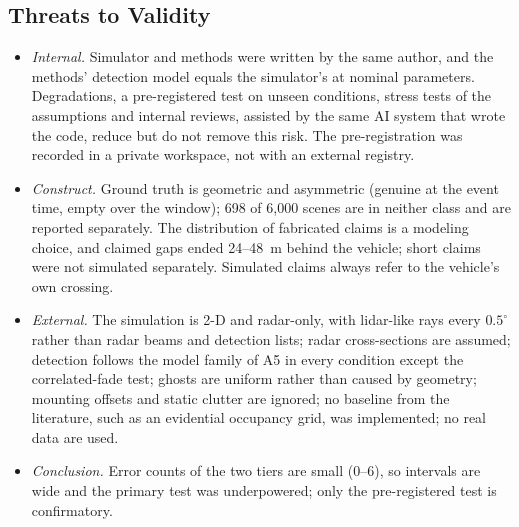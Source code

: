 \subsection{Threats to Validity}
\begin{itemize}
\item \emph{Internal.} Simulator and methods were written by the same author, and the methods' detection model equals the simulator's at nominal parameters. Degradations, a pre-registered test on unseen conditions, stress tests of the assumptions and internal reviews, assisted by the same AI system that wrote the code, reduce but do not remove this risk. The pre-registration was recorded in a private workspace, not with an external registry.
\item \emph{Construct.} Ground truth is geometric and asymmetric (genuine at the event time, empty over the window); 698 of 6,000 scenes are in neither class and are reported separately. The distribution of fabricated claims is a modeling choice, and claimed gaps ended 24--48~m behind the vehicle; short claims were not simulated separately. Simulated claims always refer to the vehicle's own crossing.
\item \emph{External.} The simulation is 2-D and radar-only, with lidar-like rays every $0.5^\circ$ rather than radar beams and detection lists; radar cross-sections are assumed; detection follows the model family of A5 in every condition except the correlated-fade test; ghosts are uniform rather than caused by geometry; mounting offsets and static clutter are ignored; no baseline from the literature, such as an evidential occupancy grid, was implemented; no real data are used.
\item \emph{Conclusion.} Error counts of the two tiers are small (0--6), so intervals are wide and the primary test was underpowered; only the pre-registered test is confirmatory.
\end{itemize}

